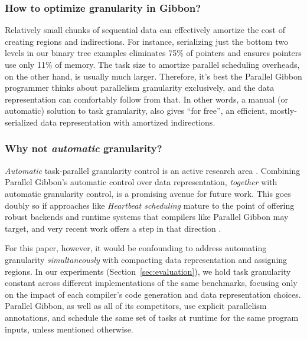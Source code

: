 \documentclass[acmsmall,acmthm=false,nonacm]{acmart}
\theoremstyle{straighttext0}
\theoremstyle{straighttext}
\newcommand{\Secref}[1]{Section~\ref{#1}}
\begin{document}
{\subsubsection{How to optimize granularity in Gibbon?}

%
Relatively small chunks of sequential data can effectively amortize the
cost of creating regions and indirections.
%
For instance, serializing just the bottom two levels in our binary tree examples eliminates 75\% of pointers and ensures pointers use only 11\% of memory.
%
The task size to amortize parallel scheduling overheads, on the other
hand, is usually much larger.  Therefore, it's best the Parallel
Gibbon programmer thinks about parallelism granularity exclusively,
and the data representation can comfortably follow from that.
%
% 
In other words, a manual (or automatic) solution to task granularity, also gives ``for free'', an efficient, mostly-serialized data representation with amortized indirections.
%

\subsubsection{Why not {\em automatic} granularity?}

{\em Automatic} task-parallel granularity control is an active research area
\cite{Heartbeat_17,OracleGuided_19}.
%
Combining Parallel Gibbon's automatic
control over data representation, {\em together} with automatic
granularity control, is a promising avenue for future work.  This goes
doubly so if approaches like {\em Heartbeat scheduling}
\cite{Heartbeat_17} mature to the point of offering robust backends
and runtime systems that compilers like Parallel Gibbon may target,
and very recent work offers a step in that direction \cite{TPAL_21}.


For this paper, however, it would be confounding to address automating
granularity {\em simultaneously} with compacting data representation and
assigning regions.
%
In our experiments (\Secref{sec:evaluation}), we hold task granularity
constant across different implementations of the same benchmarks,
focusing only on the impact of each compiler's code generation and
data representation choices.
%
Parallel Gibbon, as well as all of its competitors, use explicit
parallelism annotations, and schedule the same set of tasks at runtime
for the same program inputs, unless mentioned otherwise.


}
\end{document}
